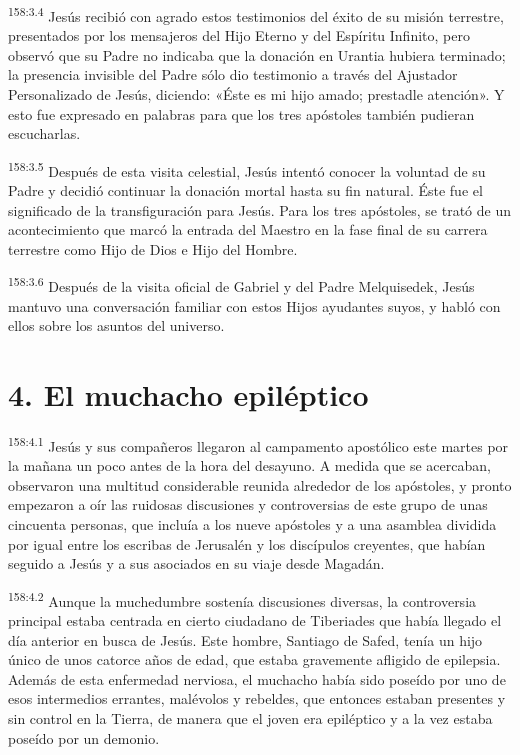 \par 
\textsuperscript{158:3.4} Jesús recibió con agrado estos testimonios del éxito de su misión terrestre, presentados por los mensajeros del Hijo Eterno y del Espíritu Infinito, pero observó que su Padre no indicaba que la donación en Urantia hubiera terminado; la presencia invisible del Padre sólo dio testimonio a través del Ajustador Personalizado de Jesús, diciendo: «Éste es mi hijo amado; prestadle atención». Y esto fue expresado en palabras para que los tres apóstoles también pudieran escucharlas.

\par 
\textsuperscript{158:3.5} Después de esta visita celestial, Jesús intentó conocer la voluntad de su Padre y decidió continuar la donación mortal hasta su fin natural. Éste fue el significado de la transfiguración para Jesús. Para los tres apóstoles, se trató de un acontecimiento que marcó la entrada del Maestro en la fase final de su carrera terrestre como Hijo de Dios e Hijo del Hombre.

\par 
\textsuperscript{158:3.6} Después de la visita oficial de Gabriel y del Padre Melquisedek, Jesús mantuvo una conversación familiar con estos Hijos ayudantes suyos, y habló con ellos sobre los asuntos del universo.

\section*{4. El muchacho epiléptico}
\par 
\textsuperscript{158:4.1} Jesús y sus compañeros llegaron al campamento apostólico este martes por la mañana un poco antes de la hora del desayuno. A medida que se acercaban, observaron una multitud considerable reunida alrededor de los apóstoles, y pronto empezaron a oír las ruidosas discusiones y controversias de este grupo de unas cincuenta personas, que incluía a los nueve apóstoles y a una asamblea dividida por igual entre los escribas de Jerusalén y los discípulos creyentes, que habían seguido a Jesús y a sus asociados en su viaje desde Magadán.

\par 
\textsuperscript{158:4.2} Aunque la muchedumbre sostenía discusiones diversas, la controversia principal estaba centrada en cierto ciudadano de Tiberiades que había llegado el día anterior en busca de Jesús. Este hombre, Santiago de Safed, tenía un hijo único de unos catorce años de edad, que estaba gravemente afligido de epilepsia. Además de esta enfermedad nerviosa, el muchacho había sido poseído por uno de esos intermedios errantes, malévolos y rebeldes, que entonces estaban presentes y sin control en la Tierra, de manera que el joven era epiléptico y a la vez estaba poseído por un demonio.

